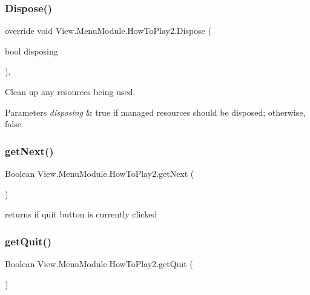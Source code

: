 \subsubsection{\texorpdfstring{Dispose()}{Dispose()}}
{\footnotesize\ttfamily override void View.\+Menu\+Module.\+How\+To\+Play2.\+Dispose (\begin{DoxyParamCaption}\item[{bool}]{disposing }\end{DoxyParamCaption})\hspace{0.3cm}{\ttfamily [inline]}, {\ttfamily [protected]}}



Clean up any resources being used. 


\begin{DoxyParams}{Parameters}
{\em disposing} & true if managed resources should be disposed; otherwise, false.\\
\hline
\end{DoxyParams}
\hypertarget{class_view_1_1_menu_module_1_1_how_to_play2_a87c3fef50b6780fbe2ed6d7798849504}{}\label{class_view_1_1_menu_module_1_1_how_to_play2_a87c3fef50b6780fbe2ed6d7798849504} 
\subsubsection{\texorpdfstring{get\+Next()}{getNext()}}
{\footnotesize\ttfamily Boolean View.\+Menu\+Module.\+How\+To\+Play2.\+get\+Next (\begin{DoxyParamCaption}{ }\end{DoxyParamCaption})\hspace{0.3cm}{\ttfamily [inline]}}

returns if quit button is currently clicked \hypertarget{class_view_1_1_menu_module_1_1_how_to_play2_af3cfed592dae438daa6edc729fb4893f}{}\label{class_view_1_1_menu_module_1_1_how_to_play2_af3cfed592dae438daa6edc729fb4893f} 
\subsubsection{\texorpdfstring{get\+Quit()}{getQuit()}}
{\footnotesize\ttfamily Boolean View.\+Menu\+Module.\+How\+To\+Play2.\+get\+Quit (\begin{DoxyParamCaption}{ }\end{DoxyParamCaption})\hspace{0.3cm}{\ttfamily [inline]}}

